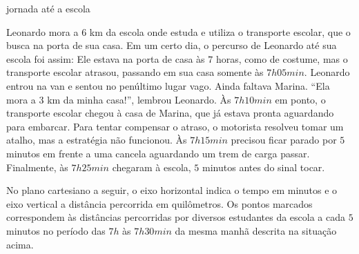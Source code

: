 \begin{task}{ jornada até a escola}
\label{\detokenize{AF106-4:atividade-jornada-ate-a-escola}}\label{\detokenize{AF106-4:ativ-funcoes-jornada-ate-a-escola}}

Leonardo mora a \(6\) km da escola onde estuda e utiliza o transporte escolar, que o busca na porta de sua casa. Em um certo dia, o percurso de Leonardo até sua escola foi assim: Ele estava na porta de casa às \(7\) horas, como de costume, mas o transporte escolar atrasou, passando em sua casa somente às \(7h05min\). Leonardo entrou na van e sentou no penúltimo lugar vago. Ainda faltava Marina. “Ela mora a \(3\) km da minha casa!”, lembrou Leonardo. Às \(7h10min\) em ponto, o transporte escolar chegou à casa de Marina, que já estava pronta aguardando para embarcar. Para tentar compensar o atraso, o motorista resolveu tomar um atalho, mas a estratégia não funcionou. Às \(7h15min\) precisou ficar parado por \(5\) minutos em frente a uma cancela aguardando um trem de carga passar. Finalmente, às \(7h25min\) chegaram à escola, \(5\) minutos antes do sinal tocar.

No plano cartesiano a seguir, o eixo horizontal indica o tempo em minutos e o eixo vertical a distância percorrida em quilômetros. Os pontos marcados correspondem às distâncias percorridas por diversos estudantes da escola a cada \(5\) minutos no período das \(7h\) às \(7h30min\) da mesma manhã descrita na situação acima.

\label{\detokenize{AF106-4:fig-pontos-jornada}}
\begin{figure}[H]
\centering

\end{figure}



\end{task}

